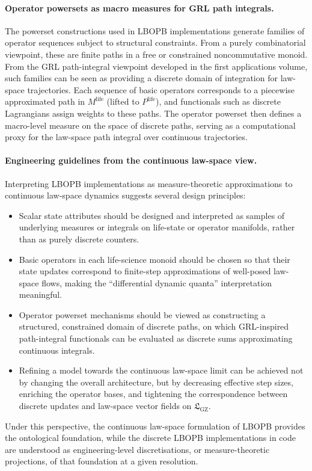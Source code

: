 \documentclass[11pt]{book}
\theoremstyle{plain}
\theoremstyle{definition}
\theoremstyle{remark}
\newcommand{\GZLS}{\ensuremath{\mathfrak{L}_{\mathrm{GZ}}}}       \newcommand{\GZLT}{\ensuremath{M_{!w}}}                           \newcommand{\GZLOC}{\ensuremath{A_M}}                             \newcommand{\GZLCurv}{\ensuremath{\mathcal{F}_{\mathrm{law}}}}
\begin{document}
\paragraph{Operator powersets as macro measures for GRL path integrals.}
The powerset constructions used in LBOPB implementations generate
families of operator sequences subject to structural constraints. From
a purely combinatorial viewpoint, these are finite paths in a free or
constrained noncommutative monoid. From the GRL path-integral
viewpoint developed in the first applications volume, such families
can be seen as providing a discrete domain of integration for law-space
trajectories. Each sequence of basic operators corresponds to a
piecewise approximated path in $M^{\mathrm{life}}$ (lifted to
$P^{\mathrm{life}}$), and functionals such as discrete Lagrangians
assign weights to these paths. The operator powerset then defines a
macro-level measure on the space of discrete paths, serving as a
computational proxy for the law-space path integral over continuous
trajectories.

\paragraph{Engineering guidelines from the continuous law-space view.}
Interpreting LBOPB implementations as measure-theoretic approximations
to continuous law-space dynamics suggests several design principles:
\begin{itemize}
  \item Scalar state attributes should be designed and interpreted as
        samples of underlying measures or integrals on life-state or
        operator manifolds, rather than as purely discrete counters.
  \item Basic operators in each life-science monoid should be chosen
        so that their state updates correspond to finite-step
        approximations of well-posed law-space flows, making the
        ``differential dynamic quanta'' interpretation meaningful.
  \item Operator powerset mechanisms should be viewed as constructing
        a structured, constrained domain of discrete paths, on which
        GRL-inspired path-integral functionals can be evaluated as
        discrete sums approximating continuous integrals.
  \item Refining a model towards the continuous law-space limit can be
        achieved not by changing the overall architecture, but by
        decreasing effective step sizes, enriching the operator bases,
        and tightening the correspondence between discrete updates and
        law-space vector fields on $\GZLS$.
\end{itemize}
Under this perspective, the continuous law-space formulation of LBOPB
provides the ontological foundation, while the discrete LBOPB
implementations in code are understood as engineering-level
discretisations, or measure-theoretic projections, of that foundation
at a given resolution.
\end{document}
